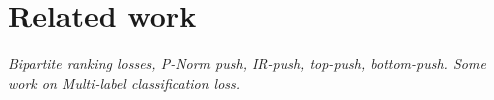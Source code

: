 \section{Related work}
\label{sec:related}

{\it
Bipartite ranking losses, \eg P-Norm push, IR-push, top-push, bottom-push.
Some work on Multi-label classification loss.
}
